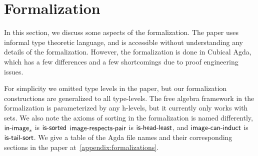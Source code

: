 
\section{Formalization}
\label{sec:formalization}

In this section, we discuss some aspects of the formalization.
The paper uses informal type theoretic language,
and is accessible without understanding any details of the formalization.
However, the formalization is done in Cubical Agda, which has a few differences and a few
shortcomings due to proof engineering issues.

For simplicity we omitted type levels in the paper, but our formalization constructions
are generalized to all type-levels.
The free algebra framework in the formalization is
parameterized by any h-levels, but it currently only works with sets.
We also note the axioms of sorting in the formalization is named differently,
$\operatorname{\mathsf{in-image}}_s$ is $\operatorname{\mathsf{is-sorted}}$
$\operatorname{\mathsf{image-respects-pair}}$ is $\operatorname{\mathsf{is-head-least}}$, and
$\operatorname{\mathsf{image-can-induct}}$ is $\operatorname{\mathsf{is-tail-sort}}$.
We give a table of the Agda file names and their corresponding sections in the paper
at~\cref{appendix:formalizations}.

